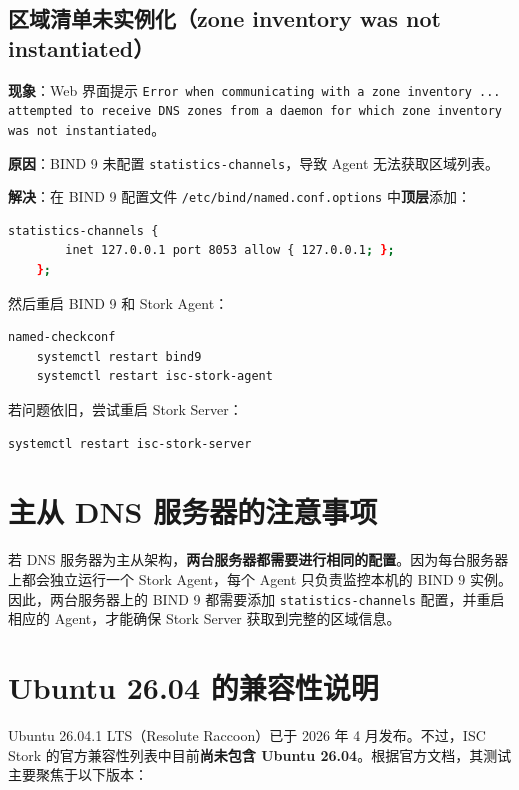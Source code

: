 \documentclass[UTF8, a4paper, 11pt, oneside]{ctexbook}
\begin{document}
\section{区域清单未实例化（zone inventory was not instantiated）}

\textbf{现象}：Web 界面提示 \texttt{Error when communicating with a zone inventory ... attempted to receive DNS zones from a daemon for which zone inventory was not instantiated}。

\textbf{原因}：BIND 9 未配置 \texttt{statistics-channels}，导致 Agent 无法获取区域列表。

\textbf{解决}：在 BIND 9 配置文件 \verb|/etc/bind/named.conf.options| 中\textbf{顶层}添加：

\begin{lstlisting}[language=bash]
	statistics-channels {
		inet 127.0.0.1 port 8053 allow { 127.0.0.1; };
	};
\end{lstlisting}

然后重启 BIND 9 和 Stork Agent：

\begin{lstlisting}[language=bash]
	named-checkconf
	systemctl restart bind9
	systemctl restart isc-stork-agent
\end{lstlisting}

若问题依旧，尝试重启 Stork Server：

\begin{lstlisting}[language=bash]
	systemctl restart isc-stork-server
\end{lstlisting}

\chapter{主从 DNS 服务器的注意事项}

若 DNS 服务器为主从架构，\textbf{两台服务器都需要进行相同的配置}。因为每台服务器上都会独立运行一个 Stork Agent，每个 Agent 只负责监控本机的 BIND 9 实例。因此，两台服务器上的 BIND 9 都需要添加 \texttt{statistics-channels} 配置，并重启相应的 Agent，才能确保 Stork Server 获取到完整的区域信息。

\chapter{Ubuntu 26.04 的兼容性说明}

Ubuntu 26.04.1 LTS（Resolute Raccoon）已于 2026 年 4 月发布。不过，ISC Stork 的官方兼容性列表中目前\textbf{尚未包含 Ubuntu 26.04}。根据官方文档，其测试主要聚焦于以下版本：
\end{document}

